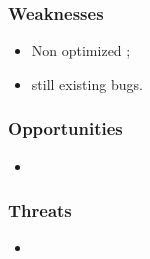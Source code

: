 \documentclass[a4paper,11pt]{article}%
\begin{document}
\subsubsection*{Weaknesses}
\begin{itemize}
\item Non optimized ;
\item still existing bugs.
\end{itemize}

\subsubsection*{Opportunities}
\begin{itemize}
\item 
\end{itemize}

\subsubsection*{Threats}
\begin{itemize}
\item 
\end{itemize}
\end{document}
